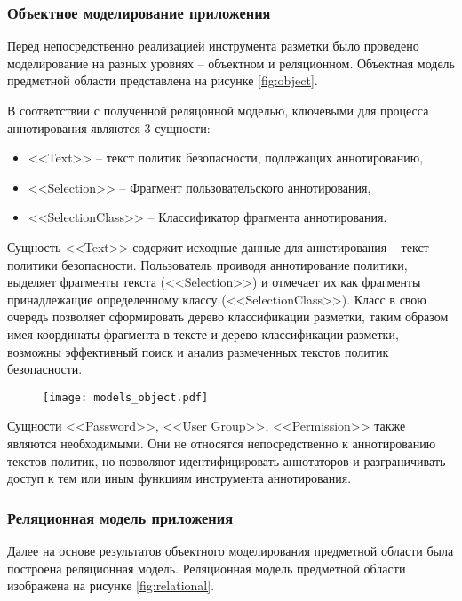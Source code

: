 \documentclass[../main]{subfiles}
\begin{document}
\subsubsection{Объектное моделирование приложения}

Перед непосредственно реализацией инструмента разметки было проведено моделирование на разных уровнях -- объектном и реляционном. Объектная модель предметной области представлена на рисунке \ref{fig:object}.

В соответствии с полученной реляцонной моделью, ключевыми для процесса аннотирования являются 3 сущности:
\begin{itemize}
    \item <<Text>> -- текст политик безопасности, подлежащих аннотированию,
    \item <<Selection>> -- Фрагмент пользовательского аннотирования,
    \item <<SelectionClass>> -- Классификатор фрагмента аннотирования.
\end{itemize}

Сущность <<Text>> содержит исходные данные для аннотирования -- текст политики безопасности. Пользователь проиводя аннотирование политики, выделяет фрагменты текста (<<Selection>>) и отмечает их как фрагменты принадлежащие определенному классу (<<SelectionClass>>). Класс в свою очередь позволяет сформировать дерево классификации разметки, таким образом имея координаты фрагмента в тексте и дерево классификации разметки, возможны эффективный поиск и анализ размеченных текстов политик безопасности.

\begin{figure}[H]
    \centering
    {\texttt{[image: models\_object.pdf]}}
    \vspace{-\baselineskip}
\end{figure}

Сущности <<Password>>, <<User Group>>, <<Permission>> также являются необходимыми. Они не относятся непосредственно к аннотированию текстов политик, но позволяют идентифицировать аннотаторов и разграничивать доступ к тем или иным функциям инструмента аннотирования.


\subsubsection{Реляционная модель приложения}

Далее на основе результатов объектного моделирования предметной области была построена реляционная модель. Реляционная модель предметной области изображена на рисунке \ref{fig:relational}.
\end{document}
